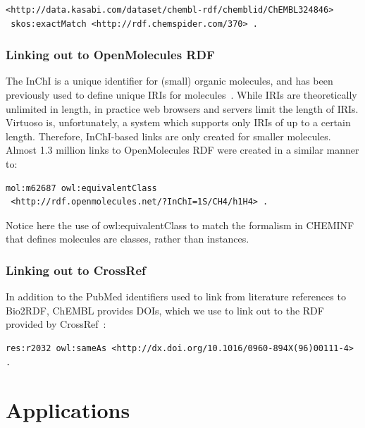 \documentclass[10pt]{bmc_article}
\newenvironment{bmcformat}{\begin{raggedright}\baselineskip20pt\sloppy\setboolean{publ}{false}}{\end{raggedright}\baselineskip20pt\sloppy}
\begin{document}
\begin{bmcformat}
\begin{small}
\begin{verbatim}
<http://data.kasabi.com/dataset/chembl-rdf/chemblid/ChEMBL324846>
 skos:exactMatch <http://rdf.chemspider.com/370> .
\end{verbatim}
\end{small}

\subsubsection*{Linking out to OpenMolecules RDF}

The InChI is a unique identifier for (small) organic molecules, and has been previously used
to define unique IRIs for molecules~\cite{Bradley2009,Willighagen2011}. While IRIs are theoretically unlimited in length,
in practice web browsers and servers limit the length of IRIs. Virtuoso is, unfortunately,
a system which supports only IRIs of up to a certain length. Therefore, InChI-based links are only created for smaller molecules. 
Almost 1.3 million links to OpenMolecules RDF were created in a similar manner to:

\begin{small}
\begin{verbatim}
mol:m62687 owl:equivalentClass
 <http://rdf.openmolecules.net/?InChI=1S/CH4/h1H4> .
\end{verbatim}
\end{small}

Notice here the use of owl:equivalentClass to match the formalism in CHEMINF that defines molecules
are classes, rather than instances.

\subsubsection*{Linking out to CrossRef}

In addition to the PubMed identifiers used to link from literature references to Bio2RDF,
ChEMBL provides DOIs, which we use to link out to the RDF provided by CrossRef~\cite{Bilder2011}:

\begin{small}
\begin{verbatim}
res:r2032 owl:sameAs <http://dx.doi.org/10.1016/0960-894X(96)00111-4> .
\end{verbatim}
\end{small}

\section*{Applications}


\end{bmcformat}
\end{document}
